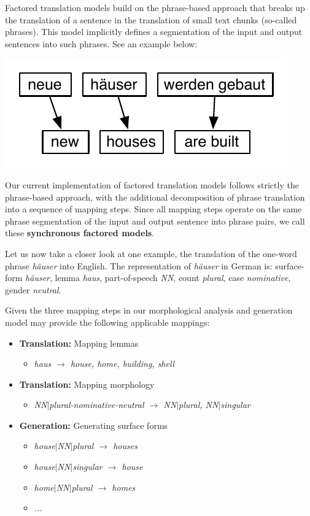 \documentclass[11pt]{report}
\theoremstyle{plain}
\begin{document}
Factored translation models build on the phrase-based approach that breaks up the translation of a sentence in the translation of small text chunks (so-called phrases). This model implicitly defines a segmentation of the input and output sentences into such phrases. See an example below:

\begin{center}
\includegraphics[scale=0.75]{phrase-model-houses.pdf}
\end{center}

Our current implementation of factored translation models follows strictly the phrase-based approach, with the additional decomposition of phrase translation into a sequence of mapping steps. Since all mapping steps operate on the same phrase segmentation of the input and output sentence into phrase pairs, we call these {\bf synchronous factored models}. 

Let us now take a closer look at one example, the translation of the one-word phrase {\em h{\"a}user} into English. The representation of {\em h{\"a}user} in German is: surface-form {\em h{\"a}user}, lemma {\em haus}, part-of-speech {\em NN}, count {\em plural}, case {\em nominative}, gender {\em neutral}. 

Given the three mapping steps in our morphological analysis and generation model may provide the following applicable mappings:
\begin{itemize}
\item {\bf Translation:} Mapping lemmas
\begin{itemize}
\item {\em haus $\rightarrow$ house, home, building, shell}
\end{itemize}
\item {\bf Translation:} Mapping morphology
\begin{itemize}
\item {\em NN$|$plural-nominative-neutral $\rightarrow$ NN$|$plural, NN$|$singular} 
\end{itemize}
\item {\bf Generation:} Generating surface forms
\begin{itemize}
\item {\em house$|$NN$|$plural $\rightarrow$ houses} 
\item {\em house$|$NN$|$singular $\rightarrow$ house} 
\item {\em home$|$NN$|$plural $\rightarrow$ homes} 
\item {\em ...}
\end{itemize}
\end{itemize}
\end{document}
